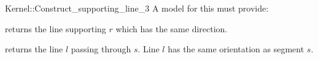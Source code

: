 \begin{ccRefFunctionObjectConcept}{Kernel::Construct_supporting_line_3}
A model for this must provide:


       {returns the line supporting $r$ which has the same direction.}

       {returns the line $l$ passing through $s$. Line $l$  has the
        same orientation as segment $s$.}

\end{ccRefFunctionObjectConcept}

